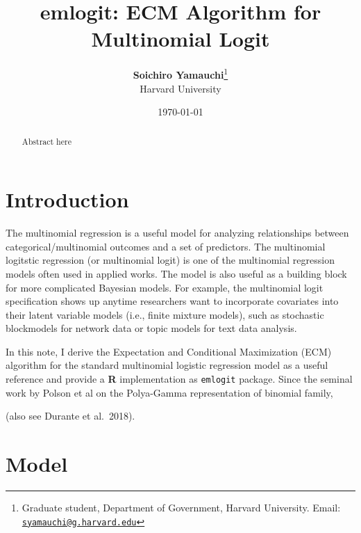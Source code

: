 \documentclass[11pt, letterpaper]{article}
\title{ \LARGE\textbf{emlogit: ECM Algorithm for Multinomial Logit}}
\author{
\textbf{Soichiro Yamauchi}\thanks{Graduate student, Department of Government, Harvard University. Email:
\href{mailto:syamauchi@g.harvard.edu}{\nolinkurl{syamauchi@g.harvard.edu}}}\\
                      {\normalsize Harvard University}
                      }
\date{\today}
\begin{document}
\maketitle



\begin{abstract}

\noindent Abstract here

\end{abstract}





\section{Introduction}

The multinomial regression is a useful model for analyzing relationships
between categorical/multinomial outcomes and a set of predictors. The
multinomial logitstic regression (or multinomial logit) is one of the
multinomial regression models often used in applied works. The model is
also useful as a building block for more complicated Bayesian models.
For example, the multinomial logit specification shows up anytime
researchers want to incorporate covariates into their latent variable
models (i.e., finite mixture models), such as stochastic blockmodels for
network data or topic models for text data analysis.

In this note, I derive the Expectation and Conditional Maximization
(ECM) algorithm for the standard multinomial logistic regression model
as a useful reference and provide a \textbf{R} implementation as
\texttt{emlogit} package. Since the seminal work by Polson et al on the
Polya-Gamma representation of binomial family,

(also see Durante et al.~2018).

\section{Model}


\end{document}
